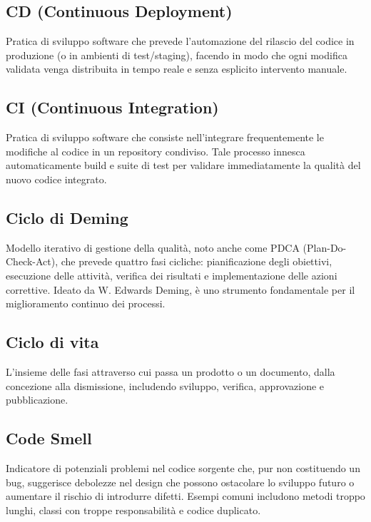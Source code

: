 \documentclass[a4paper, 11pt, oneside]{scrartcl} %
\begin{document}
\subsection*{CD (Continuous Deployment)}
Pratica di sviluppo software che prevede l'automazione del rilascio del codice in produzione (o in ambienti di test/staging), facendo in modo che ogni modifica validata venga distribuita in tempo reale e senza esplicito intervento manuale.
\vspace{0.5cm}

\subsection*{CI (Continuous Integration)}
Pratica di sviluppo software che consiste nell'integrare frequentemente le modifiche al codice in un repository condiviso. Tale processo innesca automaticamente build e suite di test per validare immediatamente la qualità del nuovo codice integrato.
\vspace{0.5cm}

\subsection*{Ciclo di Deming}
Modello iterativo di gestione della qualità, noto anche come PDCA (Plan-Do-Check-Act), che prevede quattro fasi cicliche: pianificazione degli obiettivi, esecuzione delle attività, verifica dei risultati e implementazione delle azioni correttive. Ideato da W. Edwards Deming, è uno strumento fondamentale per il miglioramento continuo dei processi.
\vspace{0.5cm}

\subsection*{Ciclo di vita}


L'insieme delle fasi attraverso cui passa un prodotto o un documento, dalla concezione alla dismissione, includendo sviluppo, verifica, approvazione e pubblicazione.

\vspace{0.5cm}

\subsection*{Code Smell}
Indicatore di potenziali problemi nel codice sorgente che, pur non costituendo un bug, suggerisce debolezze nel design che possono ostacolare lo sviluppo futuro o aumentare il rischio di introdurre difetti. Esempi comuni includono metodi troppo lunghi, classi con troppe responsabilità e codice duplicato.
\vspace{0.5cm}
\end{document}

